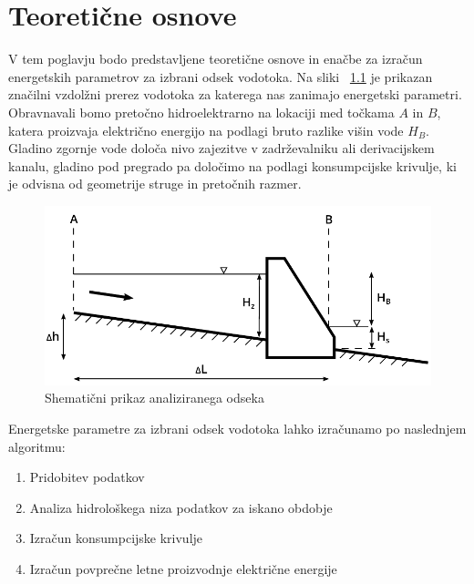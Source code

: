 \chapter{Teoretične osnove}

V tem poglavju bodo predstavljene teoretične osnove in enačbe za izračun energetskih parametrov za izbrani odsek vodotoka. Na sliki ~\ref{fig:uvodna_slika} je prikazan značilni vzdolžni prerez vodotoka za katerega nas zanimajo energetski parametri. Obravnavali bomo pretočno hidroelektrarno na lokaciji med točkama $A$ in $B$, katera proizvaja električno energijo na podlagi bruto razlike višin vode $H_B$. Gladino zgornje vode določa nivo zajezitve v zadrževalniku ali derivacijskem kanalu, gladino pod pregrado pa določimo na podlagi konsumpcijske krivulje, ki je odvisna od geometrije struge in pretočnih razmer.



\begin{figure}[ht!]
	\begin{centering}
		\includegraphics{slike/uvod/uvodna_slika.pdf}		
		\caption{Shematični prikaz analiziranega odseka}\label{fig:uvodna_slika}
	\end{centering}
\end{figure}





Energetske parametre za izbrani odsek vodotoka lahko izračunamo po naslednjem algoritmu:
\begin{enumerate}[noitemsep, topsep=0pt]
	\item Pridobitev podatkov
	\item Analiza hidrološkega niza podatkov za iskano obdobje
	\item Izračun konsumpcijske krivulje
	\item Izračun povprečne letne proizvodnje električne energije
\end{enumerate}


